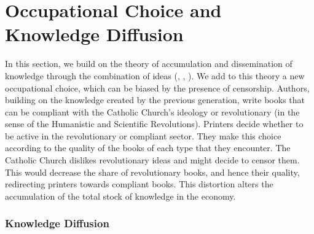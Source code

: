 
\section{Occupational Choice and Knowledge Diffusion}\label{section:theory}

In this section, we build on  the theory of  accumulation and dissemination of knowledge through the combination of ideas (, , ). We add to this theory a new occupational choice, which can be biased by the presence of censorship.
Authors, building on the knowledge created by the previous generation, write books that can be compliant with the Catholic Church's ideology or revolutionary (in the sense of the Humanistic and Scientific Revolutions). Printers decide whether to be active in the revolutionary or compliant sector. They make this choice according to the quality of the books of each type that they encounter.  The Catholic Church dislikes revolutionary ideas and might decide to censor them. This would decrease the share of revolutionary books, and hence their quality, redirecting printers towards compliant books. This distortion  alters the accumulation of the total stock of knowledge in the economy.

\subsubsection*{Knowledge Diffusion}


